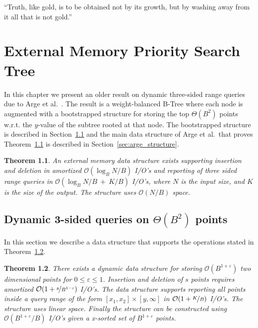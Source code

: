 \documentclass[twoside,11pt,openright]{report}
\def \epsilon {\varepsilon}
\newtheorem{theorem}{Theorem}
\begin{document}
\begin{savequote}[0.5\textwidth]
``Truth, like gold, is to be obtained not by its growth, but by washing away from it all that is not gold.''
\end{savequote}
\chapter{External Memory Priority Search Tree}
\label{chp:arge_pst}
In this chapter we present an older result on dynamic three-sided range queries due to Arge et al.~\cite{arge_samoladas_vitter_1999}.
The result is a weight-balanced B-Tree where each node is augmented with a bootstrapped structure for storing the top $\Theta(B^2)$ points w.r.t. the $y$-value of the subtree rooted at that node. The bootstrapped structure is described in Section~\ref{sec:child_structure} and the main data structure of Arge et al.~that proves Theorem~\ref{thm:arge_structure} is described in Section~\ref{sec:arge_structure}.

\begin{theorem}
\label{thm:arge_structure}
An external memory data structure exists supporting insertion and deletion in amortized $\mathcal{O}(\log_B N/B)$ I/O's and reporting of three sided range queries in $\mathcal{O}(\log_B N/B~+~K/B)$ I/O's, where $N$ is the input size, and $K$ is the size of the output. The structure uses $\mathcal{O}(N/B)$ space.
\end{theorem}

\section{Dynamic 3-sided queries on \texorpdfstring{$\Theta(B^2)$}{tb2} points}
\label{sec:child_structure}
In this section we describe a data structure that supports the operations stated in Theorem~\ref{thm:child_structure}.
\begin{theorem}
\label{thm:child_structure}
There exists a dynamic data structure for storing $\mathcal{O}(B^{1+\epsilon})$ two dimensional points for $0 \leq \epsilon \leq 1$.
Insertion and deletion of $s$ points requires amortized $\mathcal{O}(1+\nicefrac{s}{B^{1-\epsilon}})$ I/O's.
The data structure supports reporting all points inside a query range of the form $[x_1,x_2] \times [y,\infty]$ in $\mathcal{O}(1+\nicefrac{K}{B})$ I/O's.
The structure uses linear space.
Finally the structure can be constructed using $\mathcal{O}(B^{1+\epsilon} / B)$ I/O's given a x-sorted set of $B^{1+\epsilon}$ points.
\end{theorem}
\end{document}
